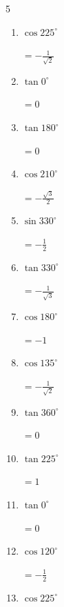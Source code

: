 \begin{multicols}{5}
\begin{enumerate}
        $\displaystyle =-1$

  \item $\displaystyle \cos{225^\circ}$

        $\displaystyle =-\frac{1}{\sqrt{2}}$

  \item $\displaystyle \tan{0^\circ}$

        $\displaystyle =0$

  \item $\displaystyle \tan{180^\circ}$

        $\displaystyle =0$

  \item $\displaystyle \cos{210^\circ}$

        $\displaystyle =-\frac{\sqrt{3}}{2}$

  \item $\displaystyle \sin{330^\circ}$

        $\displaystyle =-\frac{1}{2}$

  \item $\displaystyle \tan{330^\circ}$

        $\displaystyle =-\frac{1}{\sqrt{3}}$

\columnbreak %

  \item $\displaystyle \cos{180^\circ}$

        $\displaystyle =-1$

  \item $\displaystyle \cos{135^\circ}$

        $\displaystyle =-\frac{1}{\sqrt{2}}$

  \item $\displaystyle \tan{360^\circ}$

        $\displaystyle =0$

  \item $\displaystyle \tan{225^\circ}$

        $\displaystyle =1$

  \item $\displaystyle \tan{0^\circ}$

        $\displaystyle =0$

  \item $\displaystyle \cos{120^\circ}$

        $\displaystyle =-\frac{1}{2}$

  \item $\displaystyle \cos{225^\circ}$


\end{enumerate}
\end{multicols}
